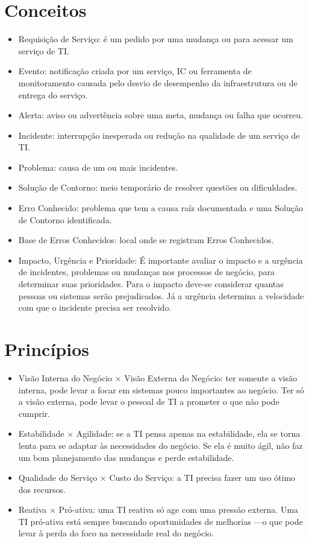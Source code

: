 \section{Conceitos}
\label{sec:opera:conceitos}
\begin{itemize}
    \item Requisição de Serviço: é um pedido por uma mudança ou para acessar um
        serviço de TI.
    \item Evento: notificação criada por um serviço, IC ou ferramenta de
        monitoramento causada pelo desvio de desempenho da infraestrutura ou de
        entrega do serviço.
    \item Alerta: aviso ou advertência sobre uma meta, mudança ou falha que
        ocorreu.
    \item Incidente: interrupção inesperada ou redução na qualidade de um
        serviço de TI.
    \item Problema: causa de um ou mais incidentes.
    \item Solução de Contorno: meio temporário de resolver questões ou
        dificuldades.
    \item Erro Conhecido: problema que tem a causa raíz documentada e uma
        Solução de Contorno identificada.
	\item Base de Erros Conhecidos: local onde se registram Erros Conhecidos.
    \item Impacto, Urgência e Prioridade: É importante avaliar o impacto e a
        urgência de incidentes, problemas ou mudanças nos processos de negócio,
        para determinar suas prioridades. Para o impacto deve-se considerar
        quantas pessoas ou sistemas serão prejudicados. Já a urgência determina
        a velocidade com que o incidente precisa ser resolvido.
\end{itemize}


\section{Princípios}
\label{sec:opera:principios}
\begin{itemize}
    \item Visão Interna do Negócio $\times$ Visão Externa do Negócio: ter
        somente a visão interna, pode levar a focar em sistemas pouco
        importantes ao negócio. Ter só a visão externa, pode levar o pessoal de
        TI a prometer o que não pode cumprir.
    \item Estabilidade $\times$ Agilidade: se a TI pensa apenas na
        estabilidade, ela se torna lenta para se adaptar às necessidades do
        negócio. Se ela é muito ágil, não faz um bom planejamento das mudanças
        e perde estabilidade.
    \item Qualidade do Serviço $\times$ Custo do Serviço: a TI precisa fazer um
        uso ótimo dos recursos.
    \item Reativa $\times$ Pró-ativa: uma TI reativa só age com uma pressão
        externa. Uma TI pró-ativa está sempre buscando oportunidades de
        melhorias ---o que pode levar à perda do foco na necessidade real do
        negócio.
\end{itemize}

